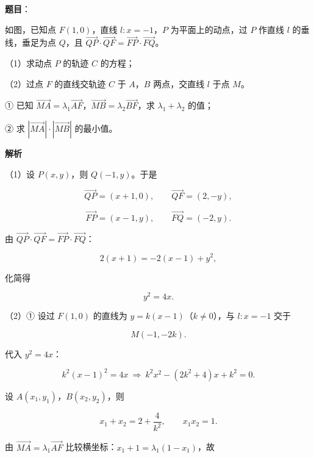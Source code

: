\begin{answer}

\textbf{题目}：

如图，已知点 $F(1,0)$，直线 $l:x=-1$，$P$ 为平面上的动点，过 $P$ 作直线 $l$ 的垂线，垂足为点 $Q$，且 $\overrightarrow{QP}\cdot\overrightarrow{QF}=\overrightarrow{FP}\cdot\overrightarrow{FQ}$。

（1）求动点 $P$ 的轨迹 $C$ 的方程；

（2）过点 $F$ 的直线交轨迹 $C$ 于 $A$，$B$ 两点，交直线 $l$ 于点 $M$。

① 已知 $\overrightarrow{MA}=\lambda_1\overrightarrow{AF}$，$\overrightarrow{MB}=\lambda_2\overrightarrow{BF}$，求 $\lambda_1+\lambda_2$ 的值；

② 求 $\left|\overrightarrow{MA}\right|\cdot\left|\overrightarrow{MB}\right|$ 的最小值。
\nopagebreak[4]
\begin{center}\end{center}
\nopagebreak[4]
\textbf{解析}

（1）设 $P(x,y)$，则 $Q(-1,y)$。于是

\nopagebreak[4]
\[\overrightarrow{QP}=(x+1,0),\qquad \overrightarrow{QF}=(2,-y),\]

\nopagebreak[4]
\[\overrightarrow{FP}=(x-1,y),\qquad \overrightarrow{FQ}=(-2,y).\]

由 $\overrightarrow{QP}\cdot\overrightarrow{QF}=\overrightarrow{FP}\cdot\overrightarrow{FQ}$：

\nopagebreak[4]
\[2(x+1)=-2(x-1)+y^2,\]

化简得

\nopagebreak[4]
\[y^2=4x.\]

（2）① 设过 $F(1,0)$ 的直线为 $y=k(x-1)$（$k\neq0$），与 $l:x=-1$ 交于

\nopagebreak[4]
\[M(-1,-2k).\]

代入 $y^2=4x$：

\nopagebreak[4]
\[k^2(x-1)^2=4x\ \Longrightarrow\ k^2x^2-(2k^2+4)x+k^2=0.\]

设 $A(x_1,y_1)$，$B(x_2,y_2)$，则

\nopagebreak[4]
\[x_1+x_2=2+\frac4{k^2},\qquad x_1x_2=1.\]

由 $\overrightarrow{MA}=\lambda_1\overrightarrow{AF}$ 比较横坐标：$x_1+1=\lambda_1(1-x_1)$，故


\end{answer}
